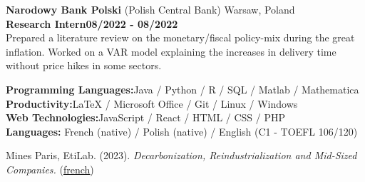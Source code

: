 \noindent\textbf{Narodowy Bank Polski} (Polish Central Bank) \hfill Warsaw, Poland\\[0.1cm]
\textbf{Research Intern}\hfill \textbf{08/2022  - 08/2022} \\
Prepared a literature review on the monetary/fiscal policy-mix during the great inflation. Worked on a VAR model explaining the increases in delivery time without price hikes in some sectors. 


	\begin{flushleft}
	\raisebox{-.6ex}{SKILLS} \hrulefill
	\end{flushleft}



  \noindent\textbf{Programming Languages:}\hfill{Java / Python / R / SQL / Matlab / Mathematica} \\
  \textbf{Productivity:}\hfill LaTeX / Microsoft Office / Git / Linux / Windows\\
  \textbf{Web Technologies:}\hfill JavaScript / React / HTML / CSS / PHP  \\
  \textbf{Languages:} \hfill French (native) / Polish (native) / English (C1 - TOEFL 106/120) 

	\begin{flushleft}
	\raisebox{-.6ex}{CONTRIBUTIONS \& PROJECTS} \hrulefill
	\end{flushleft}

\noindent Mines Paris, EtiLab. (2023). \emph{Decarbonization, Reindustrialization and Mid-Sized Companies.} (\href{https://etilab.minesparis.psl.eu/wp-content/uploads/2023/12/etilab-decarboner-les-ETI-04dec23.pdf}{\underline{french}})